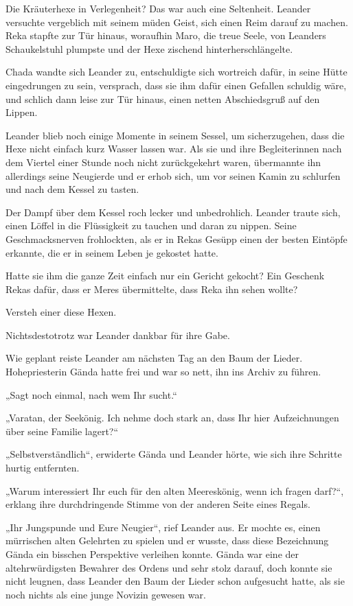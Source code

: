 Die Kräuterhexe in Verlegenheit? Das war auch eine Seltenheit. Leander versuchte vergeblich mit seinem müden Geist, sich einen Reim darauf zu machen. Reka stapfte zur Tür hinaus, woraufhin Maro, die treue Seele, von Leanders Schaukelstuhl plumpste und der Hexe zischend hinterherschlängelte.

Chada wandte sich Leander zu, entschuldigte sich wortreich dafür, in seine Hütte eingedrungen zu sein, versprach, dass sie ihm dafür einen Gefallen schuldig wäre, und schlich dann leise zur Tür hinaus, einen netten Abschiedsgruß auf den Lippen.

Leander blieb noch einige Momente in seinem Sessel, um sicherzugehen, dass die Hexe nicht einfach kurz Wasser lassen war. Als sie und ihre Begleiterinnen nach dem Viertel einer Stunde noch nicht zurückgekehrt waren, übermannte ihn allerdings seine Neugierde und er erhob sich, um vor seinen Kamin zu schlurfen und nach dem Kessel zu tasten.

Der Dampf über dem Kessel roch lecker und unbedrohlich. Leander traute sich, einen Löffel in die Flüssigkeit zu tauchen und daran zu nippen. Seine Geschmacksnerven frohlockten, als er in Rekas Gesüpp einen der besten Eintöpfe erkannte, die er in seinem Leben je gekostet hatte.

Hatte sie ihm die ganze Zeit einfach nur ein Gericht gekocht? Ein Geschenk Rekas dafür, dass er Meres übermittelte, dass Reka ihn sehen wollte?

Versteh einer diese Hexen.

Nichtsdestotrotz war Leander dankbar für ihre Gabe.\bigskip







Wie geplant reiste Leander am nächsten Tag an den Baum der Lieder. Hohepriesterin Gända hatte frei und war so nett, ihn ins Archiv zu führen.

„Sagt noch einmal, nach wem Ihr sucht.“

„Varatan, der Seekönig. Ich nehme doch stark an, dass Ihr hier Aufzeichnungen über seine Familie lagert?“

„Selbstverständlich“, erwiderte Gända und Leander hörte, wie sich ihre Schritte hurtig entfernten.

„Warum interessiert Ihr euch für den alten Meereskönig, wenn ich fragen darf?“, erklang ihre durchdringende Stimme von der anderen Seite eines Regals.

„Ihr Jungspunde und Eure Neugier“, rief Leander aus. Er mochte es, einen mürrischen alten Gelehrten zu spielen und er wusste, dass diese Bezeichnung Gända ein bisschen Perspektive verleihen konnte. Gända war eine der altehrwürdigsten Bewahrer des Ordens und sehr stolz darauf, doch konnte sie nicht leugnen, dass Leander den Baum der Lieder schon aufgesucht hatte, als sie noch nichts als eine junge Novizin gewesen war.

